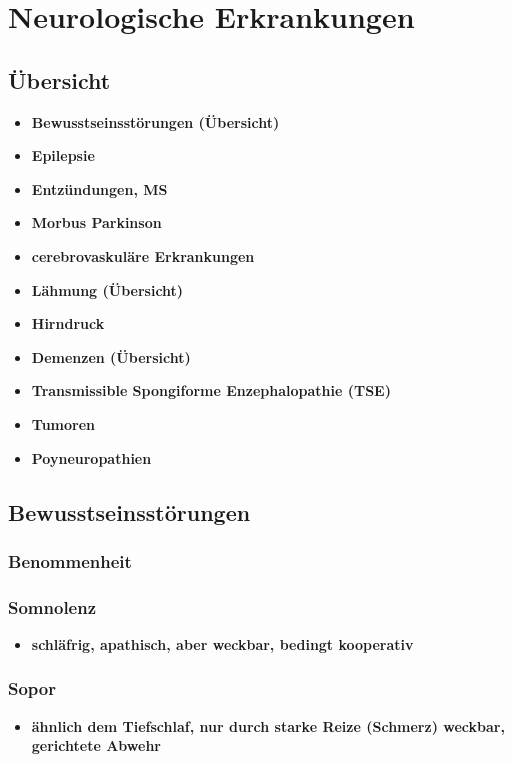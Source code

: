 \section*{Neurologische Erkrankungen}
	\subsection*{Übersicht}
		\begin{itemize}
			\item \textbf{Bewusstseinsstörungen (Übersicht)}
			\item \textbf{Epilepsie}
			\item \textbf{Entzündungen, MS}
			\item \textbf{Morbus Parkinson}
			\item \textbf{cerebrovaskuläre Erkrankungen}
			\item \textbf{Lähmung (Übersicht)}
			\item \textbf{Hirndruck}
			\item \textbf{Demenzen (Übersicht)}
			\item \textbf{Transmissible Spongiforme Enzephalopathie (TSE)}
			\item \textbf{Tumoren}
			\item \textbf{Poyneuropathien}
		\end{itemize}
	\subsection*{Bewusstseinsstörungen}
		\subsubsection*{Benommenheit}
		\subsubsection*{Somnolenz}
			\begin{itemize}
				\item \textbf{schläfrig, apathisch, aber weckbar, bedingt kooperativ}
			\end{itemize}
		\subsubsection*{Sopor}
			\begin{itemize}
				\item \textbf{ähnlich dem Tiefschlaf, nur durch starke Reize (Schmerz) weckbar, gerichtete Abwehr}
			\end{itemize}
